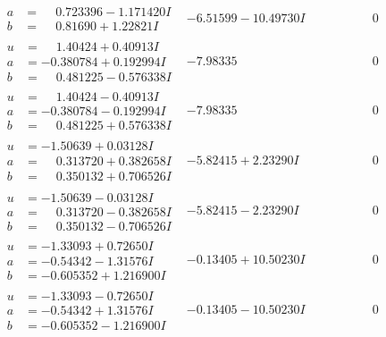 \documentclass[1p]{elsarticle_modified}
\theoremstyle{definition}
\begin{document}
$$\begin{array}{c|c|c}
\begin{aligned}
a &= \phantom{-}0.723396 - 1.171420 I \\
b &= \phantom{-}0.81690 + 1.22821 I\end{aligned}
 & -6.51599 - 10.49730 I & \phantom{-0.000000 } 0 \\ \hline\begin{aligned}
u &= \phantom{-}1.40424 + 0.40913 I \\
a &= -0.380784 + 0.192994 I \\
b &= \phantom{-}0.481225 - 0.576338 I\end{aligned}
 & -7.98335\phantom{ +0.000000I} & \phantom{-0.000000 } 0 \\ \hline\begin{aligned}
u &= \phantom{-}1.40424 - 0.40913 I \\
a &= -0.380784 - 0.192994 I \\
b &= \phantom{-}0.481225 + 0.576338 I\end{aligned}
 & -7.98335\phantom{ +0.000000I} & \phantom{-0.000000 } 0 \\ \hline\begin{aligned}
u &= -1.50639 + 0.03128 I \\
a &= \phantom{-}0.313720 + 0.382658 I \\
b &= \phantom{-}0.350132 + 0.706526 I\end{aligned}
 & -5.82415 + 2.23290 I & \phantom{-0.000000 } 0 \\ \hline\begin{aligned}
u &= -1.50639 - 0.03128 I \\
a &= \phantom{-}0.313720 - 0.382658 I \\
b &= \phantom{-}0.350132 - 0.706526 I\end{aligned}
 & -5.82415 - 2.23290 I & \phantom{-0.000000 } 0 \\ \hline\begin{aligned}
u &= -1.33093 + 0.72650 I \\
a &= -0.54342 - 1.31576 I \\
b &= -0.605352 + 1.216900 I\end{aligned}
 & -0.13405 + 10.50230 I & \phantom{-0.000000 } 0 \\ \hline\begin{aligned}
u &= -1.33093 - 0.72650 I \\
a &= -0.54342 + 1.31576 I \\
b &= -0.605352 - 1.216900 I\end{aligned}
 & -0.13405 - 10.50230 I & \phantom{-0.000000 } 0 \\ \hline\begin{aligned}

\end{aligned}
\end{array}$$
\end{document}

